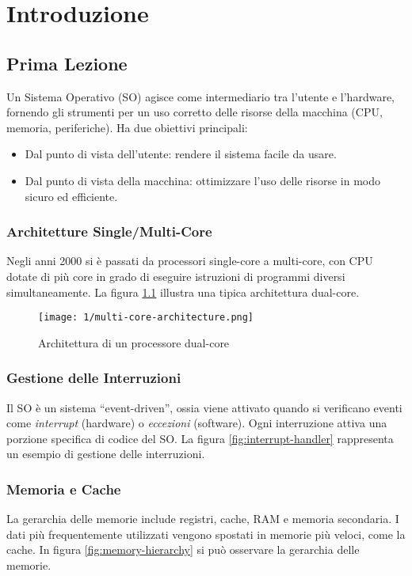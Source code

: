 \chapter{Introduzione}

\section{Prima Lezione}
Un Sistema Operativo (SO) agisce come intermediario tra l'utente e l'hardware, fornendo gli strumenti per un uso corretto delle risorse della macchina (CPU, memoria, periferiche). Ha due obiettivi principali:
\begin{itemize}
    \item Dal punto di vista dell'utente: rendere il sistema facile da usare.
    \item Dal punto di vista della macchina: ottimizzare l'uso delle risorse in modo sicuro ed efficiente.
\end{itemize}

\subsection{Architetture Single/Multi-Core}
Negli anni 2000 si è passati da processori single-core a multi-core, con CPU dotate di più core in grado di eseguire istruzioni di programmi diversi simultaneamente. La figura \ref{fig:multi-core} illustra una tipica architettura dual-core.

\begin{figure}[h!]
    \centering
    \texttt{[image: 1/multi-core-architecture.png]}
    \caption{Architettura di un processore dual-core}
    \label{fig:multi-core}
\end{figure}

\subsection{Gestione delle Interruzioni}
Il SO è un sistema ``event-driven'', ossia viene attivato quando si verificano eventi come \textit{interrupt} (hardware) o \textit{eccezioni} (software). Ogni interruzione attiva una porzione specifica di codice del SO. La figura \ref{fig:interrupt-handler} rappresenta un esempio di gestione delle interruzioni.


\subsection{Memoria e Cache}
La gerarchia delle memorie include registri, cache, RAM e memoria secondaria. I dati più frequentemente utilizzati vengono spostati in memorie più veloci, come la cache. In figura \ref{fig:memory-hierarchy} si può osservare la gerarchia delle memorie.

